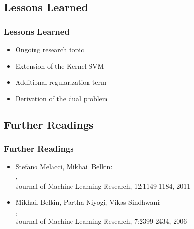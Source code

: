 \subsection{Lessons Learned}

\begin{frame}
  \frametitle{Lessons Learned}
  
  
  \begin{itemize}
    \item Ongoing research topic \\[.25cm]
    \item Extension of the Kernel SVM \\[.25cm]
    \item Additional regularization term \\[.25cm]
    \item Derivation of the dual problem
  \end{itemize}
\end{frame}



\subsection{Further Readings}

\begin{frame}
  \frametitle{Further Readings}
  
  \begin{itemize}
    \item Stefano Melacci, Mikhail Belkin: \\
      , \\
      Journal of Machine Learning Research, 12:1149-1184, 2011 \\[.25cm]
    \item Mikhail Belkin, Partha Niyogi, Vikas Sindhwani: \\
      , \\
      Journal of Machine Learning Research, 7:2399-2434, 2006
  \end{itemize}
\end{frame}


% 
